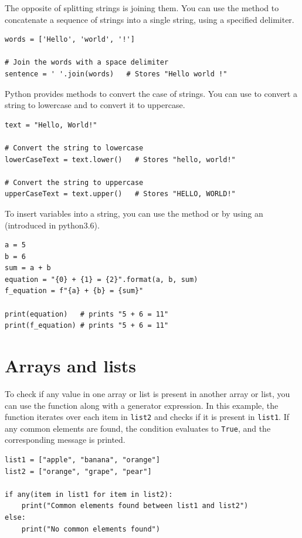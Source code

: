 The opposite of splitting strings is joining them. You can use the  method to concatenate a sequence of strings into a single string, using a specified delimiter.
\begin{lstlisting}
words = ['Hello', 'world', '!']

# Join the words with a space delimiter
sentence = ' '.join(words)   # Stores "Hello world !"
\end{lstlisting}

Python provides methods to convert the case of strings. You can use  to convert a string to lowercase and  to convert it to uppercase.

\begin{lstlisting}
text = "Hello, World!"

# Convert the string to lowercase
lowerCaseText = text.lower()   # Stores "hello, world!"

# Convert the string to uppercase
upperCaseText = text.upper()   # Stores "HELLO, WORLD!"
\end{lstlisting}

To insert variables into a string, you can use the  method or by using an  (introduced in python3.6).
\begin{lstlisting}
a = 5
b = 6
sum = a + b
equation = "{0} + {1} = {2}".format(a, b, sum)
f_equation = f"{a} + {b} = {sum}"

print(equation)   # prints "5 + 6 = 11"
print(f_equation) # prints "5 + 6 = 11"
\end{lstlisting}









\section{Arrays and lists}

To check if any value in one array or list is present in another array or list, you can use the  function along with a generator expression. In this example, the  function iterates over each item in \texttt{list2} and checks if it is present in \texttt{list1}. If any common elements are found, the condition evaluates to \texttt{True}, and the corresponding message is printed.
\begin{lstlisting}
list1 = ["apple", "banana", "orange"]
list2 = ["orange", "grape", "pear"]

if any(item in list1 for item in list2):
    print("Common elements found between list1 and list2")
else:
    print("No common elements found")
\end{lstlisting}
 
